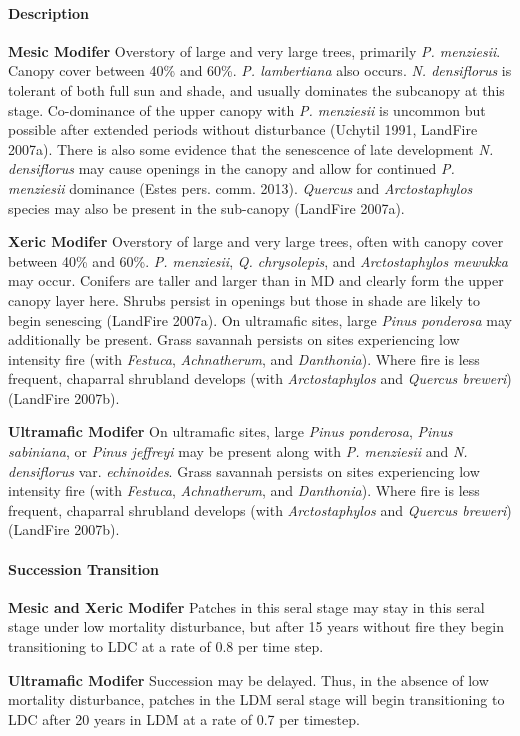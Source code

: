 \paragraph{Description}
\begin{adjustwidth}{2cm}{}
\textbf{Mesic Modifer } Overstory of large and very large trees, primarily \emph{P. menziesii}. Canopy cover between 40\% and 60\%. \emph{P. lambertiana} also occurs. \emph{N. densiflorus} is tolerant of both full sun and shade, and usually dominates the subcanopy at this stage. Co-dominance of the upper canopy with \emph{P. menziesii} is uncommon but possible after extended periods without disturbance (Uchytil 1991, LandFire 2007a). There is also some evidence that the senescence of late development \emph{N. densiflorus} may cause openings in the canopy and allow for continued \emph{P. menziesii} dominance (Estes pers. comm. 2013). \emph{Quercus} and \emph{Arctostaphylos} species may also be present in the sub-canopy (LandFire 2007a).

\medskip
\noindent \textbf{Xeric Modifer} Overstory of large and very large trees, often with canopy cover between 40\% and 60\%. \emph{P. menziesii}, \emph{Q. chrysolepis}, and \emph{Arctostaphylos mewukka} may occur. Conifers are taller and larger than in MD and clearly form the upper canopy layer here. Shrubs persist in openings but those in shade are likely to begin senescing (LandFire 2007a). On ultramafic sites, large \emph{Pinus ponderosa} may additionally be present. Grass savannah persists on sites experiencing low intensity fire (with \emph{Festuca}, \emph{Achnatherum}, and \emph{Danthonia}). Where fire is less frequent, chaparral shrubland develops (with \emph{Arctostaphylos} and \emph{Quercus breweri}) (LandFire 2007b).

\medskip
\noindent \textbf{Ultramafic Modifer} On ultramafic sites, large \emph{Pinus ponderosa}, \emph{Pinus sabiniana}, or \emph{Pinus jeffreyi} may be present along with \emph{P. menziesii} and \emph{N. densiflorus} var. \emph{echinoides}. Grass savannah persists on sites experiencing low intensity fire (with \emph{Festuca}, \emph{Achnatherum}, and \emph{Danthonia}). Where fire is less frequent, chaparral shrubland develops (with \emph{Arctostaphylos} and \emph{Quercus breweri}) (LandFire 2007b).

\end{adjustwidth}
\paragraph{Succession Transition}
\begin{adjustwidth}{2cm}{}
\textbf{Mesic and Xeric Modifer } Patches in this seral stage may stay in this seral stage under low mortality disturbance, but after 15 years without fire they begin transitioning to LDC at a rate of 0.8 per time step. 

\medskip
\noindent \textbf{Ultramafic Modifer} Succession may be delayed. Thus, in the absence of low mortality disturbance, patches in the LDM seral stage will begin transitioning to LDC after 20 years in LDM at a rate of 0.7 per timestep. 

\end{adjustwidth}
